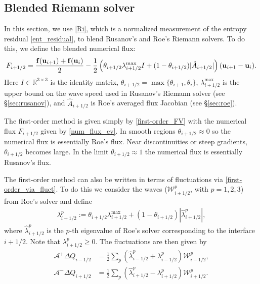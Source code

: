 \documentclass[preprint, 11pt]{article}
\newcommand{\W}{{\mathcal W}}
\newcommand{\A}{{\mathcal A}}
\newcommand{\apdq}{\A^+ \!\!{\Delta} Q}
\newcommand{\amdq}{\A^- \!\!{\Delta} Q}
\newcommand{\imh}{{i-1/2}}
\newcommand{\iph}{{i+1/2}}
\newcommand{\bff}{{\bf f}}
\newcommand{\bfu}{{\bf u}}
\begin{document}
\subsection{Blended Riemann solver}\label{sec:blended_rs}
In this section, we use \eqref{Ri}, which is a normalized measurement of the entropy residual \eqref{ent_residual},
to blend Rusanov's and Roe's Riemann solvers. To do this, we define the blended numerical flux:
\begin{align}\label{num_flux_ev}
  F_{i+1/2} = \frac{\bff(\bfu_{i+1})+\bff(\bfu_i)}{2}
  - \frac{1}{2} \left( \theta_{i+1/2}\lambda_{i+1/2}^{\max} I + (1-\theta_{i+1/2})|\hat A_{i+1/2}| \right)(\bfu_{i+1}-\bfu_{i}).
\end{align}
Here $I\in\mathbb{R}^{3\times 3}$ is the identity matrix,
$\theta_{i+1/2}=\max\{\theta_{i+1},\theta_i\}$, $\lambda_{i+1/2}^{\max}$ is the
upper bound on the wave speed used in Rusanov's Riemann solver (see \S \ref{sec:rusanov}),
and $\hat A_{i+1/2}$ is Roe's averaged flux Jacobian (see \S \ref{sec:roe}).

The first-order method is given simply by \eqref{first-order_FV}
with the numerical flux $F_{i+1/2}$ given by \eqref{num_flux_ev}.
In smooth regions $\theta_{i+1/2}\approx 0$ so the numerical flux is essentially Roe's flux.
Near discontinuities or steep gradients, $\theta_{i+1/2}$ becomes large. In the limit $\theta_{i+1/2}\approx 1$
the numerical flux is essentially Rusanov's flux.

The first-order method can also be written in terms of fluctuations via \eqref{first-order_via_fluct}.
To do this we consider the waves ($\W^p_{i\pm 1/2}$, with $p=1,2,3$)
from Roe's solver and define
\begin{align}\label{lambda_p}
  \lambda_{i+1/2}^p := \theta_{i+1/2}\lambda_{i+1/2}^{\max} + (1-\theta_{i+1/2})|\hat \lambda_{i+1/2}^p|,
\end{align}
where $\hat\lambda_{i+1/2}^p$ is the $p$-th eigenvalue of Roe's solver corresponding to the
interface $i+1/2$. Note that $\lambda_{i+1/2}^p\geq 0$.
The fluctuations are then given by
\begin{subequations}\label{ev_fluctuations}
\begin{align}
  \apdq_\imh & = \frac{1}{2}\sum_p \left(\hat\lambda_{i-1/2}^p + \lambda_{i-1/2}^p\right)\W_{i-1/2}^p, \\
  \amdq_\iph & = \frac{1}{2}\sum_p \left(\hat\lambda_{i+1/2}^p - \lambda_{i+1/2}^p\right)\W_{i+1/2}^p.
\end{align}
\end{subequations}
\end{document}
